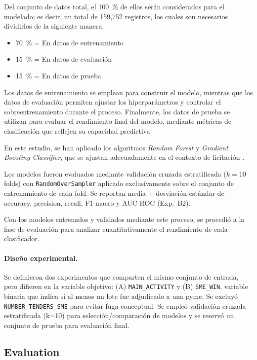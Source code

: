 \documentclass[a4paper,fleqn]{cas-sc}
\begin{document}
Del conjunto de datos total, el 100~\% de ellos serán considerados para el modelado; es decir, un total de  159,752 registros, los cuales son necesarios dividirlos  de la siguiente manera. 

\begin{itemize}
	\item 70~\% = En datos de entrenamiento
	\item 15~\% = En datos de evaluación
	\item 15~\% = En datos de prueba
\end{itemize}

Los datos de entrenamiento se emplean para construir el modelo, mientras que los datos de evaluación permiten ajustar los hiperparámetros y controlar el sobreentrenamiento durante el proceso. Finalmente, los datos de prueba se utilizan para evaluar el rendimiento final del modelo, mediante métricas de clasificación que reflejen su capacidad predictiva.

En este estudio, se han aplicado los algoritmos \textit{Random Forest} y \textit{Gradient Boosting Classifier}, que se ajustan adecuadamente en el contexto de licitación \cite{FigueroaGomez2024}.


	Los modelos fueron evaluados mediante validación cruzada estratificada ($k=10$ folds) con \texttt{RandomOverSampler} aplicado exclusivamente sobre el conjunto de entrenamiento de cada fold. Se reportan media $\pm$ desviación estándar de accuracy, precision, recall, F1-macro y AUC-ROC (Exp.~B2).

	Con los modelos entrenados y validados mediante este proceso, se procedió a la fase de evaluación para analizar cuantitativamente el rendimiento de cada clasificador.

\paragraph{\textbf{Diseño experimental.}}


Se definieron dos experimentos que comparten el mismo conjunto de entrada, pero difieren en la variable objetivo: (A) \texttt{MAIN\_ACTIVITY} y (B) \texttt{SME\_WIN}, variable binaria que indica si al menos un lote fue adjudicado a una pyme. Se excluyó \texttt{NUMBER\_TENDERS\_SME} para evitar fuga conceptual.
%
Se empleó validación cruzada estratificada (k=10) para selección/comparación de modelos y se reservó un conjunto de prueba para evaluación final.
	
\subsection{Evaluation}\label{sec:fase8}
\end{document}
